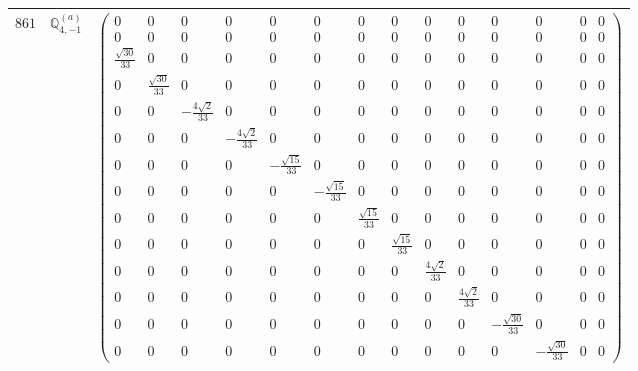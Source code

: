 \documentclass[fleqn,8pt,landscape]{jsarticle}
\begin{document}
\begin{center}
\begin{longtable}{ccc}
$ 861 $ & $ \mathbb{Q}_{4,-1}^{(a)} $ & $ \begin{pmatrix} 0 & 0 & 0 & 0 & 0 & 0 & 0 & 0 & 0 & 0 & 0 & 0 & 0 & 0 \\ 0 & 0 & 0 & 0 & 0 & 0 & 0 & 0 & 0 & 0 & 0 & 0 & 0 & 0 \\ \frac{\sqrt{30}}{33} & 0 & 0 & 0 & 0 & 0 & 0 & 0 & 0 & 0 & 0 & 0 & 0 & 0 \\ 0 & \frac{\sqrt{30}}{33} & 0 & 0 & 0 & 0 & 0 & 0 & 0 & 0 & 0 & 0 & 0 & 0 \\ 0 & 0 & - \frac{4 \sqrt{2}}{33} & 0 & 0 & 0 & 0 & 0 & 0 & 0 & 0 & 0 & 0 & 0 \\ 0 & 0 & 0 & - \frac{4 \sqrt{2}}{33} & 0 & 0 & 0 & 0 & 0 & 0 & 0 & 0 & 0 & 0 \\ 0 & 0 & 0 & 0 & - \frac{\sqrt{15}}{33} & 0 & 0 & 0 & 0 & 0 & 0 & 0 & 0 & 0 \\ 0 & 0 & 0 & 0 & 0 & - \frac{\sqrt{15}}{33} & 0 & 0 & 0 & 0 & 0 & 0 & 0 & 0 \\ 0 & 0 & 0 & 0 & 0 & 0 & \frac{\sqrt{15}}{33} & 0 & 0 & 0 & 0 & 0 & 0 & 0 \\ 0 & 0 & 0 & 0 & 0 & 0 & 0 & \frac{\sqrt{15}}{33} & 0 & 0 & 0 & 0 & 0 & 0 \\ 0 & 0 & 0 & 0 & 0 & 0 & 0 & 0 & \frac{4 \sqrt{2}}{33} & 0 & 0 & 0 & 0 & 0 \\ 0 & 0 & 0 & 0 & 0 & 0 & 0 & 0 & 0 & \frac{4 \sqrt{2}}{33} & 0 & 0 & 0 & 0 \\ 0 & 0 & 0 & 0 & 0 & 0 & 0 & 0 & 0 & 0 & - \frac{\sqrt{30}}{33} & 0 & 0 & 0 \\ 0 & 0 & 0 & 0 & 0 & 0 & 0 & 0 & 0 & 0 & 0 & - \frac{\sqrt{30}}{33} & 0 & 0 \end{pmatrix} $ \\ \hline

\end{longtable}
\end{center}
\end{document}
